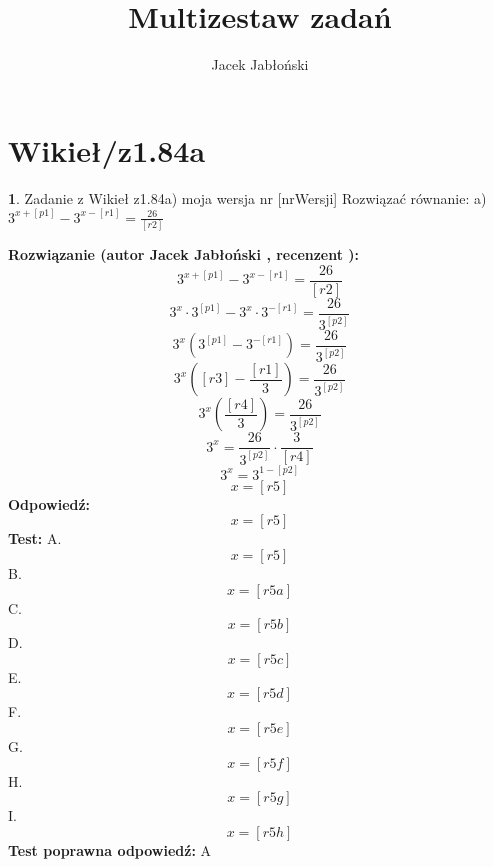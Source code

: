 \documentclass[12pt, a4paper]{article}
\title{Multizestaw zadań}
\author{Jacek Jabłoński}
\date{}
\theoremstyle{definition} %
\newtheorem{zad}{}
\newcommand{\kategoria}[1]{\section{#1}} %
\newcommand{\zadStart}[1]{\begin{zad}#1\newline} %
\newcommand{\zadStop}{\end{zad}}   %
\newcommand{\rozwStart}[2]{\noindent \textbf{Rozwiązanie (autor #1 , recenzent #2): }\newline} %
\newcommand{\rozwStop}{\newline}                                            %
\newcommand{\odpStart}{\noindent \textbf{Odpowiedź:}\newline}    %
\newcommand{\odpStop}{\newline}                                             %
\newcommand{\testStart}{\noindent \textbf{Test:}\newline} %
\newcommand{\testStop}{\newline} %
\newcommand{\kluczStart}{\noindent \textbf{Test poprawna odpowiedź:}\newline} %
\newcommand{\kluczStop}{\newline} %
\begin{document}
\maketitle


\kategoria{Wikieł/z1.84a}
\zadStart{Zadanie z Wikieł z1.84a) moja wersja nr [nrWersji]}
Rozwiązać równanie:
a) $ 3^{x+[p1]}-3^{x-[r1]}=\frac{26}{[r2]} $
\zadStop
\rozwStart{Jacek Jabłoński}{}
$$3^{x+[p1]}-3^{x-[r1]}=\frac{26}{[r2]}$$
$$3^x \cdot 3^{[p1]} - 3^x \cdot 3^{-[r1]} = \frac{26}{3^{[p2]}}$$
$$3^x (3^{[p1]} - 3^{-[r1]}) = \frac{26}{3^{[p2]}}$$
$$3^x ([r3] - \frac{[r1]}{3}) = \frac{26}{3^{[p2]}}$$
$$3^x (\frac{[r4]}{3}) = \frac{26}{3^{[p2]}}$$
$$3^x = \frac{26}{3^{[p2]}} \cdot \frac{3}{[r4]}$$
$$3^x = 3^{1-[p2]}$$
$$x = [r5]$$
\rozwStop
\odpStart
$$x = [r5]$$
\odpStop
\testStart
A. $$x = [r5]$$
B. $$x = [r5a]$$
C.$$x =[r5b]$$
D.$$x = [r5c]$$ 
E.$$x = [r5d]$$ 
F.$$x = [r5e]$$ 
G.$$x = [r5f]$$ 
H.$$x = [r5g]$$ 
I. $$x = [r5h]$$
\testStop
\kluczStart
A
\kluczStop
\end{document}
